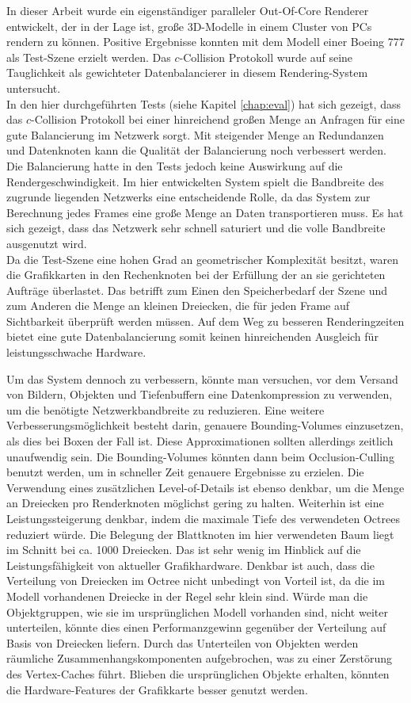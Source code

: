 In dieser Arbeit wurde ein eigenständiger paralleler Out-Of-Core Renderer entwickelt, der in der Lage ist, große 3D-Modelle in einem Cluster von PCs rendern zu können. Positive Ergebnisse konnten mit dem Modell einer Boeing 777 als Test-Szene erzielt werden. Das $c$-Collision Protokoll wurde auf seine Tauglichkeit als gewichteter Datenbalancierer in diesem Rendering-System untersucht. \\
In den hier durchgeführten Tests (siehe Kapitel \ref{chap:eval}) hat sich gezeigt, dass das $c$-Collision Protokoll bei einer hinreichend großen Menge an Anfragen für eine gute Balancierung im Netzwerk sorgt. Mit steigender Menge an Redundanzen und Datenknoten kann die Qualität der Balancierung noch verbessert werden. Die Balancierung hatte in den Tests jedoch keine Auswirkung auf die Rendergeschwindigkeit. Im hier entwickelten System spielt die Bandbreite des zugrunde liegenden Netzwerks eine entscheidende Rolle, da das System zur Berechnung jedes Frames eine große Menge an Daten transportieren muss. Es hat sich gezeigt, dass das Netzwerk sehr schnell saturiert und die volle Bandbreite ausgenutzt wird. \\
Da die Test-Szene eine hohen Grad an geometrischer Komplexität besitzt, waren die Grafikkarten in den Rechenknoten bei der Erfüllung der an sie gerichteten Aufträge überlastet. Das betrifft zum Einen den Speicherbedarf der Szene und zum Anderen die Menge an kleinen Dreiecken, die für jeden Frame auf Sichtbarkeit überprüft werden müssen. Auf dem Weg zu besseren Renderingzeiten bietet eine gute Datenbalancierung somit keinen hinreichenden Ausgleich für leistungsschwache Hardware. 

Um das System dennoch zu verbessern, könnte man versuchen, vor dem Versand von Bildern, Objekten und Tiefenbuffern eine Datenkompression zu verwenden, um die benötigte Netzwerkbandbreite zu reduzieren. Eine weitere Verbesserungsmöglichkeit besteht darin, genauere Bounding-Volumes einzusetzen, als dies bei Boxen der Fall ist. Diese Approximationen sollten allerdings zeitlich unaufwendig sein. Die Bounding-Volumes könnten dann beim Occlusion-Culling benutzt werden, um in schneller Zeit genauere Ergebnisse zu erzielen. Die Verwendung eines zusätzlichen Level-of-Details ist ebenso denkbar, um die Menge an Dreiecken pro Renderknoten möglichst gering zu halten. Weiterhin ist eine Leistungssteigerung denkbar, indem die maximale Tiefe des verwendeten Octrees reduziert würde. Die Belegung der Blattknoten im hier verwendeten Baum liegt im Schnitt bei ca. 1000 Dreiecken. Das ist sehr wenig im Hinblick auf die Leistungsfähigkeit von aktueller Grafikhardware. Denkbar ist auch, dass die Verteilung von Dreiecken im Octree nicht unbedingt von Vorteil ist, da die im Modell vorhandenen Dreiecke in der Regel sehr klein sind. Würde man die Objektgruppen, wie sie im ursprünglichen Modell vorhanden sind, nicht weiter unterteilen, könnte dies einen Performanzgewinn gegenüber der Verteilung auf Basis von Dreiecken liefern. Durch das Unterteilen von Objekten werden räumliche Zusammenhangskomponenten aufgebrochen, was zu einer Zerstörung des Vertex-Caches führt. Blieben die ursprünglichen Objekte erhalten, könnten die Hardware-Features der Grafikkarte besser genutzt werden.

%
%
